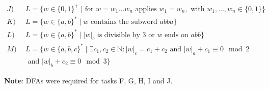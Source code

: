 \documentclass{article}
\begin{document}
\begin{align*}
    J) \ \ & L = \{ w \in \{0, 1\}^+ \mid \text{for } w=w_1 \dots w_n \text{ applies } w_1 = w_n, \text{ with } w_1, \dots, w_n \in \{0, 1\}\}\\
    K) \ \ & L = \{ w \in \{a, b\}^* \mid w \text{ contains the subword } abba \}\\
    L) \ \ & L = \{ w \in \{a, b\}^* \mid |w|_b \text{ is divisible by 3 or }  w \text{ ends on } abb \} \\
    M) \ \ & L = \{ w \in \{a, b, c\}^* \mid \exists c_1, c_2 \in \mathbb{N}: |w|_c = c_1 + c_2 \text{ and } |w|_a + c_1 \equiv 0 \mod 2 \\
    & \text{ and } |w|_b + c_2 \equiv 0 \mod 3 \}
\end{align*}

\textbf{Note}: DFAs were required for tasks F, G, H, I and J.
\end{document}
